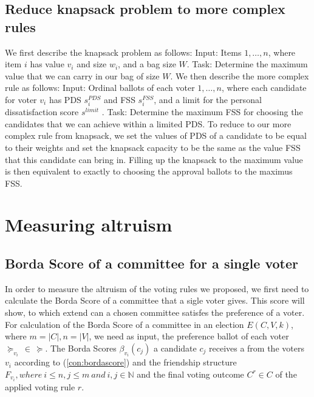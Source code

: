\documentclass{article}
\begin{document}
\subsection{Reduce knapsack problem  to more complex rules }

We first describe the knapsack problem as follows:
\newline
Input: Items $ 1, \dots , n$, where item $i$ has value $v_i$ and size $w_i$, and a bag size $W$.
\newline 
Task: Determine the maximum value that we can carry in our bag of size $W$.
\newline
\newline
We then describe the more complex rule as follows:
\newline
Input: Ordinal ballots of each voter $ 1, \dots , n$, where each candidate for voter $v_i$  has PDS $s_i^{PDS}$ and FSS $s_i^{FSS}$, and a limit for the personal dissatisfaction score $s^{limit}$ .
\newline
Task: Determine the maximum FSS for choosing the candidates that we can achieve within a limited PDS.
\newline
\newline
To reduce to our more complex rule from knapsack, we set the values of PDS of a candidate to be equal to their weights and set the knapsack capacity to be the same as the value FSS that this candidate can bring in.  Filling up the knapsack to the maximum value is then equivalent to exactly to choosing the approval ballots to the maximus FSS.
\section{Measuring altruism}
\subsection{Borda Score of a committee for a single voter}
In order to measure the altruism of the voting rules we proposed, we first need to calculate the Borda Score of a committee that a sigle voter gives. This score will show, to which extend can a chosen committee satisfes the preference of a voter. 
For calculation of the Borda Score of a committee in an election $E(C,V,k)$,  where $m = \vert C \vert, n= \vert V \vert$, we need as input, the preference ballot of each voter $\succeq_{v_i} \, \in \, \succeq$.  The Borda Scores $\beta_{v_i}(c_j)$ a candidate $c_j$ receives a from the voters $v_i$ according to (\ref{con:bordascore}) and  the friendship structure $F_{v_i}, where  \: i\leqslant n, j\leqslant m  \:and \:i, j \in \mathbb{N}$ and  the final voting outcome $C^{r} \in C$ of the applied voting rule $r$.  
\end{document}
